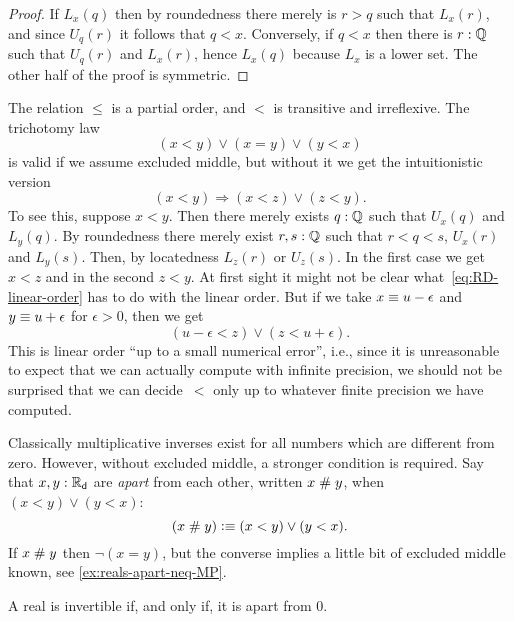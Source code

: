 \begin{proof}
  If $L_x(q)$ then by roundedness there merely is $r > q$ such that $L_x(r)$, and since
  $U_q(r)$ it follows that $q < x$. Conversely, if $q < x$ then there is $r : \mathbb{Q}$ such
  that $U_q(r)$ and $L_x(r)$, hence $L_x(q)$ because $L_x$ is a lower set. The other half
  of the proof is symmetric.
\end{proof}

The relation $\leq$ is a partial order, and $<$ is transitive and irreflexive. The
trichotomy law
%
\begin{equation*}
  (x < y) \lor (x = y) \lor (y < x)
\end{equation*}
%
is valid if we assume excluded middle, but without it we get the intuitionistic version
%
\begin{equation} \label{eq:RD-linear-order}
  (x < y) \Rightarrow (x < z) \lor (z < y).
\end{equation}
%
To see this, suppose $x < y$. Then there merely exists $q : \mathbb{Q}$ such that $U_x(q)$ and
$L_y(q)$. By roundedness there merely exist $r, s : \mathbb{Q}$ such that $r < q < s$, $U_x(r)$
and $L_y(s)$. Then, by locatedness $L_z(r)$ or $U_z(s)$. In the first case we get $x < z$
and in the second $z < y$. At first sight it might not be clear
what~\eqref{eq:RD-linear-order} has to do with the linear order. But if we take $x \equiv
u - \epsilon$ and $y \equiv u + \epsilon$ for $\epsilon > 0$, then we get
%
\begin{equation*}
  (u - \epsilon < z) \lor (z < u + \epsilon).
\end{equation*}
%
This is linear order ``up to a small numerical error'', i.e., since it is unreasonable to
expect that we can actually compute with infinite precision, we should not be surprised
that we can decide~$<$ only up to whatever finite precision we have computed.

Classically multiplicative inverses exist for all numbers which are different from zero.
However, without excluded middle, a stronger condition is required. Say that $x, y : \mathbb{R}_\mathsf{d}$
are \emph{apart} from each other, written $x \mathrel{\#} y$, when $(x < y) \lor (y < x)$:
%
\begin{equation*}
  (x \mathrel{\#} y) \vcentcolon\equiv (x < y) \lor (y < x).
\end{equation*}
%
If $x \mathrel{\#} y$ then $\lnot (x = y)$, but the converse implies a little bit of excluded
middle known, see \autoref{ex:reals-apart-neq-MP}.

\begin{thm} \label{RD-inverse-apart-0}
  A real is invertible if, and only if, it is apart from $0$.
\end{thm}

